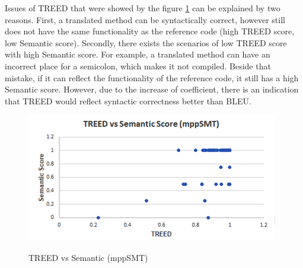 

Issues of TREED that were showed by the figure \ref{fig:TREEDmppSMT} can be explained by two reasons. First, a translated method can be syntactically correct, however still does not have the same functionality as the reference
code (high TREED score, low Semantic score). Secondly, there
exists the scenarios of low TREED score with high Semantic score. For
example, a translated method can have an incorrect place for a
semicolon, which makes it not compiled. Beside that mistake, if it can
reflect the functionality of the reference code, it still has a high
Semantic score. However, due to the increase of coefficient, there is
an indication that TREED would reflect syntactic correctness better
than BLEU.


%
\begin{figure}
\caption{TREED vs Semantic (mppSMT)}
\centering
\includegraphics{img/treed_mppSMT.png}
\label{fig:TREEDmppSMT}
\end{figure}

